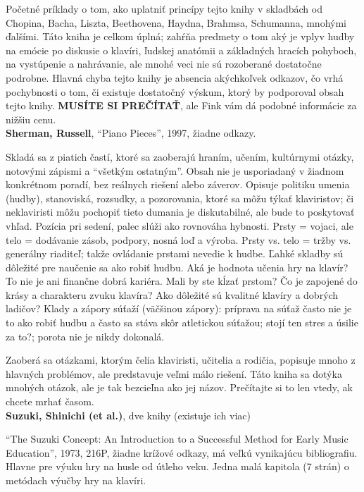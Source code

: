 \documentclass[11pt,a4paper]{book}
\begin{document}
Početné príklady o tom, ako uplatniť princípy tejto knihy v skladbách od Chopina, Bacha, Liszta, Beethovena, Haydna, Brahmsa, Schumanna, mnohými ďalšími. Táto kniha je celkom úplná; zahŕňa predmety o tom aký je vplyv hudby na emócie po diskusie o klavíri, ľudskej anatómii a základných hracích pohyboch, na vystúpenie a nahrávanie, ale mnohé veci nie sú rozoberané dostatočne podrobne. Hlavná chyba tejto knihy je absencia akýchkoľvek odkazov, čo vrhá pochybnosti o tom, či existuje dostatočný  výskum, ktorý by podporoval obsah tejto knihy. \textbf{MUSÍTE SI PREČÍTAŤ}, ale Fink vám dá podobné informácie za nižšiu cenu.
\medskip\\
\textbf{Sherman, Russell}, “Piano Pieces”, 1997, žiadne odkazy.

Skladá sa z piatich častí, ktoré sa zaoberajú hraním, učením, kultúrnymi otázky, notovými zápismi a “všetkým ostatným”. Obsah nie je usporiadaný v žiadnom konkrétnom poradí, bez reálnych riešení alebo záverov. Opisuje politiku umenia (hudby), stanoviská, rozsudky, a pozorovania, ktoré sa môžu týkať klaviristov; či neklaviristi môžu pochopiť tieto dumania je diskutabilné, ale bude to poskytovať vhľad. Pozícia pri sedení, palec slúži ako rovnováha hybnosti. Prsty = vojaci, ale telo = dodávanie zásob, podpory, nosná loď a výroba. Prsty vs. telo = tržby vs. generálny riaditeľ; takže ovládanie prstami nevedie k hudbe. Ľahké skladby sú dôležité pre naučenie sa ako robiť hudbu. Aká je hodnota učenia hry na klavír? To nie je ani finančne dobrá kariéra. Mali by ste kĺzať prstom? Čo je zapojené do krásy a charakteru zvuku klavíra? Ako dôležité sú kvalitné klavíry a dobrých ladičov? Klady a zápory súťaží (väčšinou zápory): príprava na súťaž často nie je to ako robiť hudbu a často sa stáva skôr atletickou súťažou; stojí ten stres a úsilie za to?; porota  nie je nikdy dokonalá. 

Zaoberá sa otázkami, ktorým čelia klaviristi, učitelia a rodičia, popisuje mnoho z hlavných problémov, ale predstavuje veľmi málo riešení. Táto kniha sa dotýka mnohých otázok, ale je tak bezcieľna ako jej názov. Prečítajte si to len vtedy, ak chcete mrhať časom. 
\medskip\\
\textbf{Suzuki, Shinichi (et al.)}, dve knihy (existuje ich viac)

“The Suzuki Concept: An Introduction to a Successful Method for Early Music Education”, 1973, 216P, žiadne krížové odkazy, má veľkú vynikajúcu bibliografiu. Hlavne pre výuku hry na husle od útleho veku. Jedna malá kapitola (7 strán) o metódach výučby hry na klavíri. 
\end{document}
